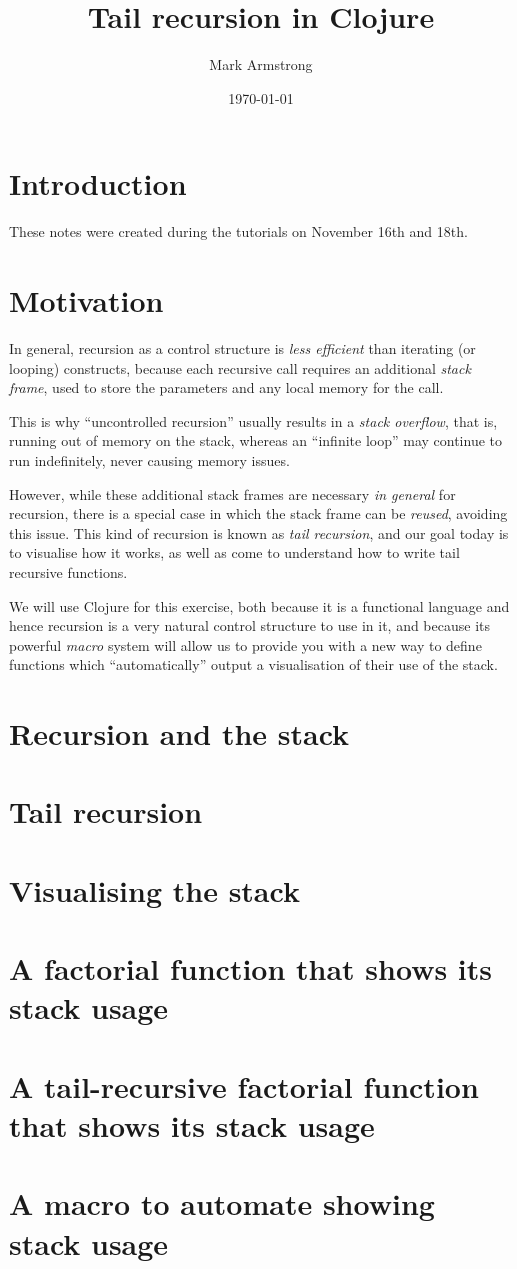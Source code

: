 \documentclass[11pt]{article}
\author{Mark Armstrong}
\date{\today}
\title{Tail recursion in Clojure}
\begin{document}
\maketitle
\tableofcontents


\section{Introduction}
\label{sec:orgf0f77dc}
These notes were created during the tutorials on November 16th and 18th.

\section{Motivation}
\label{sec:org5a5b318}
In general, recursion as a control structure is \emph{less efficient} than
iterating (or looping) constructs, because each recursive call
requires an additional \emph{stack frame}, used to store the parameters
and any local memory for the call.

This is why “uncontrolled recursion” usually results in a \emph{stack overflow},
that is, running out of memory on the stack,
whereas an “infinite loop” may continue to run indefinitely,
never causing memory issues.

However, while these additional stack frames
are necessary \emph{in general} for recursion,
there is a special case in which the stack frame can be \emph{reused},
avoiding this issue. This kind of recursion is known
as \emph{tail recursion}, and our goal today is to visualise how it works,
as well as come to understand how to write tail recursive functions.

We will use Clojure for this exercise,
both because it is a functional language and hence recursion
is a very natural control structure to use in it,
and because its powerful \emph{macro} system will allow us
to provide you with a new way to define functions
which “automatically” output a visualisation of
their use of the stack.

\section{Recursion and the stack}
\label{sec:org0e2e930}
\section{Tail recursion}
\label{sec:org6f45153}
\section{Visualising the stack}
\label{sec:org5da1a41}
\section{A factorial function that shows its stack usage}
\label{sec:org0561024}
\section{A tail-recursive factorial function that shows its stack usage}
\label{sec:orga73311c}
\section{A macro to automate showing stack usage}
\label{sec:org211c522}
\end{document}
